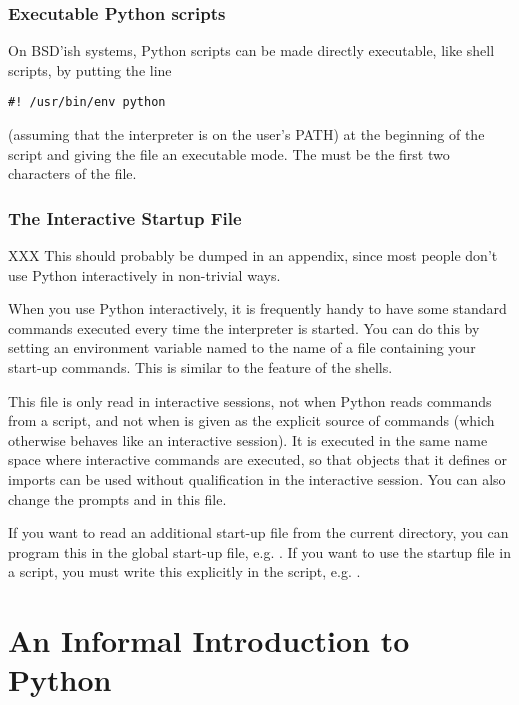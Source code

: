 \subsection{Executable Python scripts}

On BSD'ish \UNIX{} systems, Python scripts can be made directly
executable, like shell scripts, by putting the line

\bcode\begin{verbatim}
#! /usr/bin/env python
\end{verbatim}\ecode
%
(assuming that the interpreter is on the user's PATH) at the beginning
of the script and giving the file an executable mode.  The \code{\#!}
must be the first two characters of the file.

\subsection{The Interactive Startup File}

XXX This should probably be dumped in an appendix, since most people
don't use Python interactively in non-trivial ways.

When you use Python interactively, it is frequently handy to have some
standard commands executed every time the interpreter is started.  You
can do this by setting an environment variable named
 to the name of a file containing your start-up
commands.  This is similar to the  feature of the \UNIX{}
shells.

This file is only read in interactive sessions, not when Python reads
commands from a script, and not when  is given as the
explicit source of commands (which otherwise behaves like an
interactive session).  It is executed in the same name space where
interactive commands are executed, so that objects that it defines or
imports can be used without qualification in the interactive session.
You can also change the prompts  and  in
this file.

If you want to read an additional start-up file from the current
directory, you can program this in the global start-up file, e.g.
.  If you want to use the startup file
in a script, you must write this explicitly in the script, e.g.
 .

\chapter{An Informal Introduction to Python}

